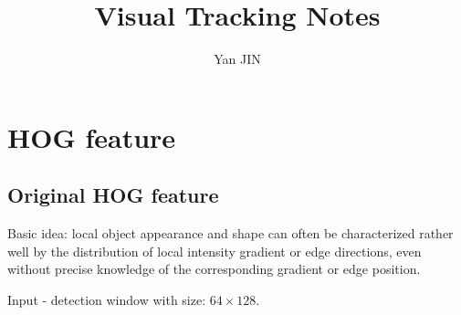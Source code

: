 \documentclass[12pt]{article}
\numberwithin{equation}{section}
\begin{document}
\small
\title{Visual Tracking Notes}
\author{Yan JIN}
\pagestyle{fancy}\fancyhf{}
\lhead{}
\lfoot{\textit{}}\cfoot{}\rfoot{\thepage}
\renewcommand{\headrulewidth}{1.pt}
\renewcommand{\footrulewidth}{1.pt}
\maketitle
\tableofcontents
\section{HOG feature \citep{dalal2005histograms} \citep{felzenszwalb2010object}} 
\subsection{Original HOG feature  \citep{dalal2005histograms} } \label{chap:hog}
Basic idea: local object appearance and shape can often be characterized rather well
by the distribution of local intensity gradient or edge directions, even without precise knowledge
of the corresponding gradient or edge position. \par
Input - detection window with size: $64 \times 128$. 
\end{document}
